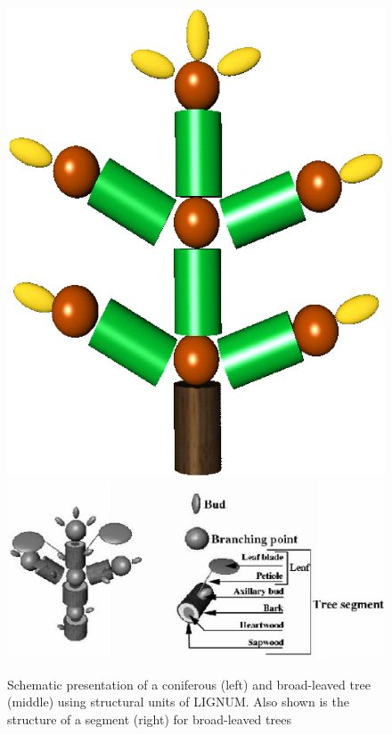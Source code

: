 \begin{figure}[p]
\includegraphics[scale=0.25]{cftree}
\includegraphics[scale=0.6]{hwtree}
\caption{Schematic presentation of a coniferous (left) and 
         broad-leaved tree (middle) using structural units of LIGNUM. 
         Also shown is the structure of a segment (right) 
         for broad-leaved trees}\label{fig:model} 
\end{figure}
